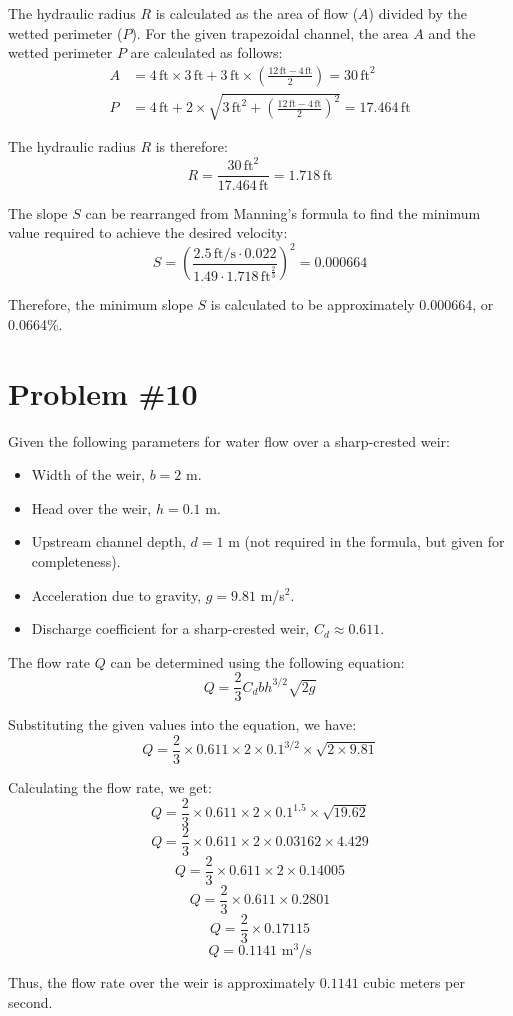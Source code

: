 \documentclass{article}
\begin{document}
The hydraulic radius \( R \) is calculated as the area of flow (\( A \)) divided by the wetted perimeter (\( P \)). For the given trapezoidal channel, the area \( A \) and the wetted perimeter \( P \) are calculated as follows:
\begin{align}
    A &= 4\, \text{ft} \times 3\, \text{ft} + 3\, \text{ft} \times \left(\frac{12\, \text{ft} - 4\, \text{ft}}{2}\right) = 30\, \text{ft}^2 \\
    P &= 4\, \text{ft} + 2 \times \sqrt{3\, \text{ft}^2 + \left(\frac{12\, \text{ft} - 4\, \text{ft}}{2}\right)^2} = 17.464\, \text{ft}
\end{align}

The hydraulic radius \( R \) is therefore:
\begin{equation}
    R = \frac{30\, \text{ft}^2}{17.464\, \text{ft}} = 1.718\, \text{ft}
\end{equation}

The slope \( S \) can be rearranged from Manning's formula to find the minimum value required to achieve the desired velocity:
\begin{equation}
    S = \left(\frac{2.5\, \text{ft/s} \cdot 0.022}{1.49 \cdot 1.718\, \text{ft}^{\frac{2}{3}}}\right)^2 = 0.000664
\end{equation}

Therefore, the minimum slope \( S \) is calculated to be approximately 0.000664, or 0.0664\%.



\newpage
\section*{Problem \#10}

Given the following parameters for water flow over a sharp-crested weir:
\begin{itemize}
    \item Width of the weir, \( b = 2 \) m.
    \item Head over the weir, \( h = 0.1 \) m.
    \item Upstream channel depth, \( d = 1 \) m (not required in the formula, but given for completeness).
    \item Acceleration due to gravity, \( g = 9.81 \) m/s\(^2\).
    \item Discharge coefficient for a sharp-crested weir, \( C_d \approx 0.611 \).
\end{itemize}

The flow rate \( Q \) can be determined using the following equation:
\[ Q = \frac{2}{3} C_d b h^{3/2} \sqrt{2g} \]

Substituting the given values into the equation, we have:
\[ Q = \frac{2}{3} \times 0.611 \times 2 \times 0.1^{3/2} \times \sqrt{2 \times 9.81} \]

Calculating the flow rate, we get:
\[ Q = \frac{2}{3} \times 0.611 \times 2 \times 0.1^{1.5} \times \sqrt{19.62} \]
\[ Q = \frac{2}{3} \times 0.611 \times 2 \times 0.03162 \times 4.429 \]
\[ Q = \frac{2}{3} \times 0.611 \times 2 \times 0.14005 \]
\[ Q = \frac{2}{3} \times 0.611 \times 0.2801 \]
\[ Q = \frac{2}{3} \times 0.17115 \]
\[ Q = 0.1141 \text{ m}^3/\text{s} \]

Thus, the flow rate over the weir is approximately \( 0.1141 \) cubic meters per second.
\end{document}
